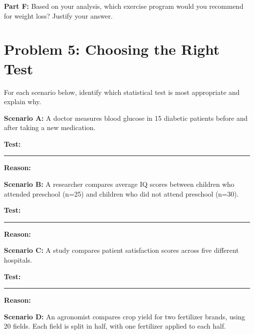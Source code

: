 \documentclass[11pt]{article}
\begin{document}
\textbf{Part F:} Based on your analysis, which exercise program would you recommend for weight loss? Justify your answer.

\vspace{3cm}

\newpage

\section{Problem 5: Choosing the Right Test}

For each scenario below, identify which statistical test is most appropriate and explain why.

\vspace{0.5cm}

\textbf{Scenario A:} A doctor measures blood glucose in 15 diabetic patients before and after taking a new medication.

\vspace{0.3cm}

\textbf{Test:} \rule{6cm}{0.4pt}

\vspace{0.3cm}

\textbf{Reason:}

\vspace{2cm}

\textbf{Scenario B:} A researcher compares average IQ scores between children who attended preschool (n=25) and children who did not attend preschool (n=30).

\vspace{0.3cm}

\textbf{Test:} \rule{6cm}{0.4pt}

\vspace{0.3cm}

\textbf{Reason:}

\vspace{2cm}

\textbf{Scenario C:} A study compares patient satisfaction scores across five different hospitals.

\vspace{0.3cm}

\textbf{Test:} \rule{6cm}{0.4pt}

\vspace{0.3cm}

\textbf{Reason:}

\vspace{2cm}

\textbf{Scenario D:} An agronomist compares crop yield for two fertilizer brands, using 20 fields. Each field is split in half, with one fertilizer applied to each half.
\end{document}
